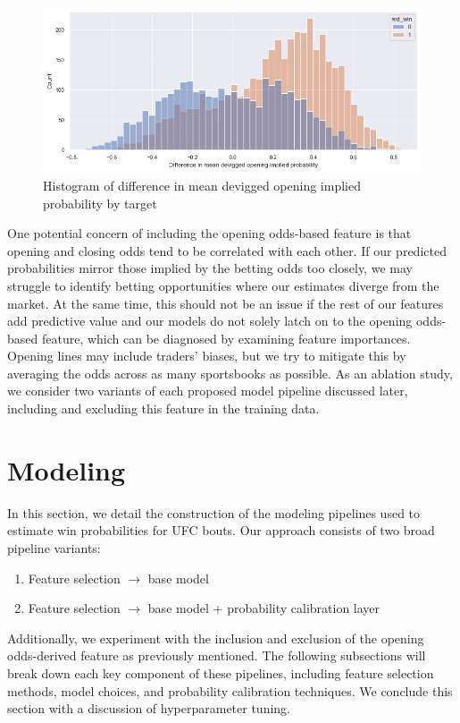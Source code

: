 \documentclass[12pt,twoside]{report}
\begin{document}
\begin{figure}[!htb]
    \centering
    \includegraphics[width=\linewidth]{figures/opening_implied.png}
    \caption{Histogram of difference in mean devigged opening implied probability by target}
    \label{opening_implied}
\end{figure}


One potential concern of including the opening odds-based feature is that opening and closing odds tend to be correlated with each other. If our predicted probabilities mirror those implied by the betting odds too closely, we may struggle to identify betting opportunities where our estimates diverge from the market. At the same time, this should not be an issue if the rest of our features add predictive value and our models do not solely latch on to the opening odds-based feature, which can be diagnosed by examining feature importances. Opening lines may include traders' biases, but we try to mitigate this by averaging the odds across as many sportsbooks as possible. As an ablation study, we consider two variants of each proposed model pipeline discussed later, including and excluding this feature in the training data. 


\section{Modeling}

In this section, we detail the construction of the modeling pipelines used to estimate win probabilities for UFC bouts. Our approach consists of two broad pipeline variants:
\begin{enumerate}
    \item Feature selection $\longrightarrow$ base model

    \item Feature selection $\longrightarrow$ base model + probability calibration layer
\end{enumerate}
Additionally, we experiment with the inclusion and exclusion of the opening odds-derived feature as previously mentioned. The following subsections will break down each key component of these pipelines, including feature selection methods, model choices, and probability calibration techniques. We conclude this section with a discussion of hyperparameter tuning.
\end{document}
